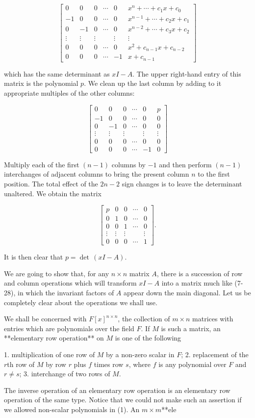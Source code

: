\[\left[\begin{array}{cccccccc}0&0&0&\cdots&0&x^{n}+\cdots+c_{1}x+c_{0}\\ -1&0&0&\cdots&0&x^{n-1}+\cdots+c_{2}x+c_{1}\\ 0&-1&0&\cdots&0&x^{n-2}+\cdots+c_{3}x+c_{2}\\ \vdots&\vdots&\vdots&&\vdots&\vdots\\ 0&0&0&\cdots&0&x^{2}+c_{n-1}x+c_{n-2}\\ 0&0&0&\cdots&-1&x+c_{n-1}\end{array}\right]\]

which has the same determinant as \(xI-A\). The upper right-hand entry of this matrix is the polynomial \(p\). We clean up the last column by adding to it appropriate multiples of the other columns:

\[\left[\begin{array}{cccccccc}0&0&0&\cdots&0&p\\ -1&0&0&\cdots&0&0\\ 0&-1&0&\cdots&0&0\\ \vdots&\vdots&\vdots&&\vdots&\vdots\\ 0&0&0&\cdots&0&0\\ 0&0&0&\cdots&-1&0\end{array}\right]\]

Multiply each of the first \((n-1)\) columns by \(-1\) and then perform \((n-1)\) interchanges of adjacent columns to bring the present column \(n\) to the first position. The total effect of the \(2n-2\) sign changes is to leave the determinant unaltered. We obtain the matrix

\[\left[\begin{array}{cccccccc}p&0&0&\cdots&0\\ 0&1&0&\cdots&0\\ 0&0&1&\cdots&0\\ \vdots&\vdots&\vdots&&\vdots\\ 0&0&0&\cdots&1\end{array}\right].\]

It is then clear that \(p=\det\,(xI-A)\).

We are going to show that, for any \(n\times n\) matrix \(A\), there is a succession of row and column operations which will transform \(xI-A\) into a matrix much like (7-28), in which the invariant factors of \(A\) appear down the main diagonal. Let us be completely clear about the operations we shall use.

We shall be concerned with \(F[x]^{n\times n}\), the collection of \(m\times n\) matrices with entries which are polynomials over the field \(F\). If \(M\) is such a matrix, an **elementary row operation** on \(M\) is one of the following

1. multiplication of one row of \(M\) by a non-zero scalar in \(F\);
2. replacement of the \(r\)th row of \(M\) by row \(r\) plus \(f\) times row \(s\), where \(f\) is any polynomial over \(F\) and \(r\neq s\);
3. interchange of two rows of \(M\).

The inverse operation of an elementary row operation is an elementary row operation of the same type. Notice that we could not make such an assertion if we allowed non-scalar polynomials in (1). An \(m\times m\)**ele 